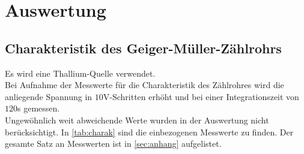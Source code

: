 \section{Auswertung}
\label{sec:Auswertung}
\subsection{Charakteristik des Geiger-Müller-Zählrohrs}

Es wird eine Thallium-Quelle verwendet. \\
Bei Aufnahme der Messwerte für die Charakteristik des Zählrohres wird 
die anliegende Spannung in $10$V-Schritten erhöht und bei einer Integrationszeit
von $120$s gemessen.\\
Ungewöhnlich weit abweichende Werte wurden in der Auswertung nicht berücksichtigt. In \autoref{tab:charak} 
sind die einbezogenen Messwerte zu finden. Der gesamte Satz an Messwerten ist in 
\autoref{sec:anhang} aufgelistet.\\

